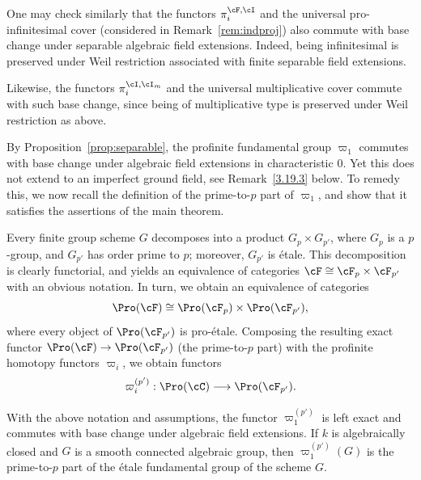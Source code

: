 \begin{rema}\label{rem:separable}
One may check similarly that the functors $\pi_i^{\cF,\cI}$ and the universal pro-infinitesimal cover (considered in Remark~\ref{rem:indproj}) also commute with base change under separable algebraic field extensions. Indeed, being infinitesimal is preserved under Weil restriction associated with finite separable field extensions.

Likewise, the functors $\pi_i^{\cI,\cI_m}$ and the universal multiplicative cover commute with such base change, since being of multiplicative type is preserved under Weil restriction as above.
\end{rema}

By Proposition~\ref{prop:separable}, the profinite fundamental group $\varpi_1$ commutes with base change under algebraic field extensions in characteristic $0$. Yet this does not extend to an imperfect ground field, see Remark~\ref{3.19.3} below. To remedy this, we now recall the definition of the prime-to-$p$ part of $\varpi_1$, and show that it satisfies the assertions of the main theorem.

Every finite group scheme $G$ decomposes into a product $G_p \times G_{p'}$, where $G_p$ is a $p$-group, and $G_{p'}$ has order prime to $p$; moreover, $G_{p'}$ is \'etale. This decomposition is clearly functorial, and yields an equivalence of categories $\cF \cong \cF_p \times \cF_{p'}$ with an obvious notation. In turn, we obtain an equivalence of categories
\[
\Pro(\cF) \cong \Pro(\cF_p) \times \Pro(\cF_{p'}),
\]
where every object of $\Pro(\cF_{p'})$ is pro-\'etale. Composing the resulting exact functor $\Pro(\cF) \to \Pro(\cF_{p'})$ (the prime-to-$p$ part) with the profinite homotopy functors $\varpi_i$, we obtain functors
\[
\varpi_i^{(p')} : \Pro(\cC) \longrightarrow \Pro(\cF_{p'}).
\]

\begin{prop}\label{prop:p'}
With the above notation and assumptions, the functor $\varpi_1^{(p')}$ is left exact and commutes with base change under algebraic field extensions. If $k$ is algebraically closed and $G$ is a smooth connected algebraic group, then $\varpi_1^{(p')}(G)$ is the prime-to-$p$ part of the \'etale fundamental group of the scheme $G$.
\end{prop}

